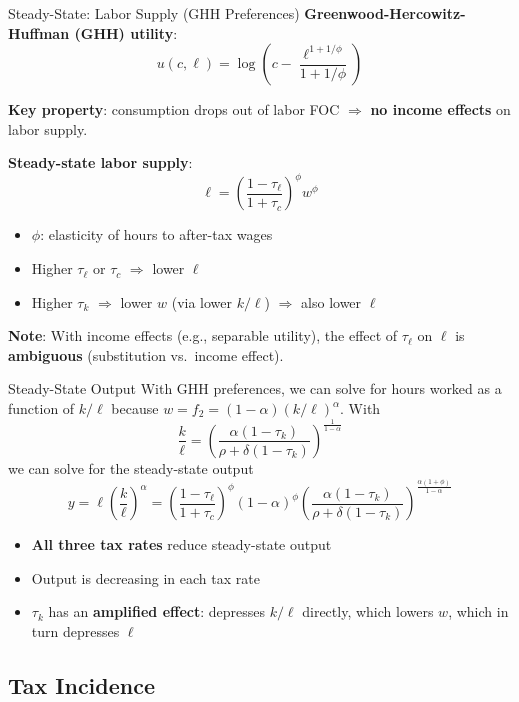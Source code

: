\documentclass[blue]{beamer}
\begin{document}
\begin{frame}{Steady-State: Labor Supply (GHH Preferences)}
	\textbf{Greenwood-Hercowitz-Huffman (GHH) utility}:
	\[
	u(c, \ell) = \log\!\left(c - \frac{\ell^{1+1/\phi}}{1+1/\phi}\right)
	\]
	
	\textbf{Key property}: consumption drops out of labor FOC $\Rightarrow$ \textbf{no income effects} on labor supply.
	
	\textbf{Steady-state labor supply}:
	\[
	\ell = \left(\frac{1-\tau_\ell}{1+\tau_c}\right)^{\!\phi} w^\phi
	\]
	
	\vspace{-6pt}
	\begin{itemize}
		\item $\phi$: elasticity of hours to after-tax wages
		\item Higher $\tau_\ell$ or $\tau_c$ $\Rightarrow$ lower $\ell$
		\item Higher $\tau_k$ $\Rightarrow$ lower $w$ (via lower $k/\ell$) $\Rightarrow$ also lower $\ell$
	\end{itemize}
	
	\textbf{Note}: With income effects (e.g., separable utility), the effect of $\tau_\ell$ on $\ell$ is \textbf{ambiguous} (substitution vs.\ income effect).
\end{frame}

\begin{frame}{Steady-State Output}
	With GHH preferences, we can solve for hours worked as a function of $k/\ell$ because $w=f_2=(1-\alpha)(k/\ell)^\alpha$. With 
	$$
	{\frac{k}{\ell} = \left(\frac{\alpha(1-\tau_k)}{\rho + \delta(1-\tau_k)}\right)^{\!\frac{1}{1-\alpha}}}
	$$ 
	we can solve for the steady-state output
	\[
	{y = \ell\left(\frac{k}{\ell}\right)^\alpha= \left(\frac{1-\tau_\ell}{1+\tau_c}\right)^{\!\phi} (1-\alpha)^\phi \left(\frac{\alpha(1-\tau_k)}{\rho + \delta(1-\tau_k)}\right)^{\!\frac{\alpha(1+\phi)}{1-\alpha}}}
	\]
	
	\begin{itemize}
		\item \textbf{All three tax rates} reduce steady-state output
		\item Output is decreasing in each tax rate
		\item $\tau_k$ has an \textbf{amplified effect}: depresses $k/\ell$ directly, which lowers $w$, which in turn depresses $\ell$
	\end{itemize}
\end{frame}


\subsection{Tax Incidence}
\end{document}
